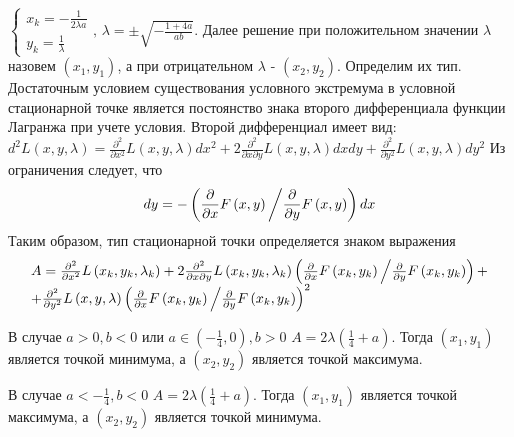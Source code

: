 \documentclass[addpoints, answers]{exam} %
\begin{document}
\begin{questions}
\begin{solution}
 $\left\{\begin{array}{c} {x_{k} =-\frac{1}{2\lambda a} } \\ {y_{k} =\frac{1}{\lambda } } \end{array}\right. ,\, \lambda =\pm \sqrt{-\frac{1+4a}{ab} } $. Далее решение при положительном значении $\lambda $ назовем $\left(x_{1} ,y_{1} \right)$, а при отрицательном $\lambda $ - $\left(x_{2} ,y_{2} \right)$. Определим их тип. Достаточным условием существования условного экстремума в условной стационарной точке является постоянство знака второго дифференциала функции Лагранжа при учете условия. Второй дифференциал имеет вид: $d^{2} L\left(x,y,\lambda \right)=\frac{\partial ^{2} }{\partial x^{2} } L\left(x,y,\lambda \right)dx^{2} +2\frac{\partial ^{2} }{\partial x\partial y} L\left(x,y,\lambda \right)dxdy+\frac{\partial ^{2} }{\partial y^{2} } L\left(x,y,\lambda \right)dy^{2} $ Из ограничения следует, что
\[
dy=-\left({\frac{\partial }{\partial x} F\left(x,y\right) \mathord{\left/{\vphantom{\frac{\partial }{\partial x} F\left(x,y\right) \frac{\partial }{\partial y} F\left(x,y\right)}}\right.\kern-\nulldelimiterspace} \frac{\partial }{\partial y} F\left(x,y\right)} \right)dx
\]
Таким образом, тип стационарной точки определяется знаком выражения
\[
\begin{array}{l} {A=\frac{\partial ^{2} }{\partial x^{2} } L\left(x_{k} ,y_{k} ,\lambda _{k} \right)+2\frac{\partial ^{2} }{\partial x\partial y} L\left(x_{k} ,y_{k} ,\lambda _{k} \right)\left({\frac{\partial }{\partial x} F\left(x_{k} ,y_{k} \right) \mathord{\left/{\vphantom{\frac{\partial }{\partial x} F\left(x_{k} ,y_{k} \right) \frac{\partial }{\partial y} F\left(x_{k} ,y_{k} \right)}}\right.\kern-\nulldelimiterspace} \frac{\partial }{\partial y} F\left(x_{k} ,y_{k} \right)} \right)+} \\ {+\frac{\partial ^{2} }{\partial y^{2} } L\left(x,y,\lambda \right)\left({\frac{\partial }{\partial x} F\left(x_{k} ,y_{k} \right) \mathord{\left/{\vphantom{\frac{\partial }{\partial x} F\left(x_{k} ,y_{k} \right) \frac{\partial }{\partial y} F\left(x_{k} ,y_{k} \right)}}\right.\kern-\nulldelimiterspace} \frac{\partial }{\partial y} F\left(x_{k} ,y_{k} \right)} \right)^{2} } \end{array}
\]

В случае $a>0,b<0$ или $a\in \left(-\frac{1}{4} ,0\right),b>0$ $A=2\lambda (\frac{1}{4} +a)$. Тогда $\left(x_{1} ,y_{1} \right)$ является точкой минимума, а $\left(x_{2} ,y_{2} \right)$ является точкой максимума.

В случае $a<-\frac{1}{4} ,b<0$ $A=2\lambda (\frac{1}{4} +a)$. Тогда $\left(x_{1} ,y_{1} \right)$ является точкой максимума, а $\left(x_{2} ,y_{2} \right)$ является точкой минимума.


\end{solution}
\end{questions}
\end{document}
